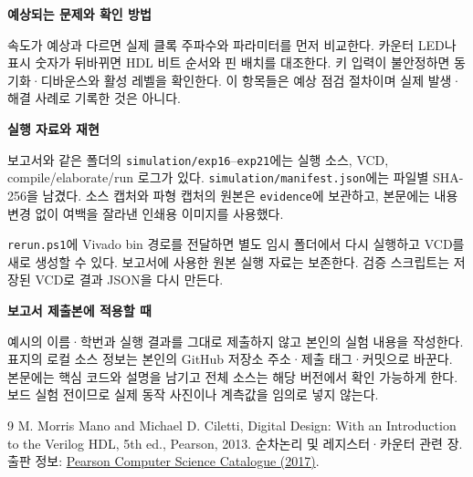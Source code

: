 \documentclass[a4paper,10pt]{article}
\begin{document}
\textbf{예상되는 문제와 확인 방법}\par
속도가 예상과 다르면 실제 클록 주파수와 파라미터를 먼저 비교한다.
카운터 LED나 표시 숫자가 뒤바뀌면 HDL 비트 순서와 핀 배치를 대조한다.
키 입력이 불안정하면 동기화·디바운스와 활성 레벨을 확인한다.
이 항목들은 예상 점검 절차이며 실제 발생·해결 사례로 기록한 것은 아니다.
\par\noindent
\textbf{실행 자료와 재현}\par
보고서와 같은 폴더의 \texttt{simulation/exp16}--\texttt{exp21}에는
실행 소스, VCD, compile/elaborate/run 로그가 있다.
\texttt{simulation/manifest.json}에는 파일별 SHA-256을 남겼다.
소스 캡처와 파형 캡처의 원본은 \texttt{evidence}에 보관하고,
본문에는 내용 변경 없이 여백을 잘라낸 인쇄용 이미지를 사용했다.

\texttt{rerun.ps1}에 Vivado bin 경로를 전달하면 별도 임시 폴더에서 다시 실행하고
VCD를 새로 생성할 수 있다. 보고서에 사용한 원본 실행 자료는 보존한다.
검증 스크립트는 저장된 VCD로 결과 JSON을 다시 만든다.

\textbf{보고서 제출본에 적용할 때}\par
예시의 이름·학번과 실행 결과를 그대로 제출하지 않고 본인의 실험 내용을 작성한다.
표지의 로컬 소스 정보는 본인의 GitHub 저장소 주소·제출 태그·커밋으로 바꾼다.
본문에는 핵심 코드와 설명을 남기고 전체 소스는 해당 버전에서 확인 가능하게 한다.
보드 실험 전이므로 실제 동작 사진이나 계측값을 임의로 넣지 않는다.

\begin{thebibliography}{9}
 M. Morris Mano and Michael D. Ciletti,
\textnormal{Digital Design: With an Introduction to the Verilog HDL},
5th ed., Pearson, 2013.
순차논리 및 레지스터·카운터 관련 장.
출판 정보: \href{https://in.pearson.com/content/dam/region-growth/india/pearson-india/About-Us/pdf/CSE_2017.pdf}{Pearson Computer Science Catalogue (2017)}.
\end{thebibliography}
\end{document}
